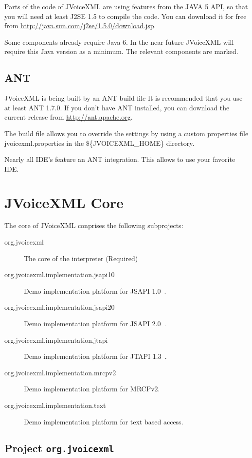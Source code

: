 \documentclass[11pt,a4paper]{article}
\begin{document}
Parts of the code of JVoiceXML are using features from the JAVA 5 API, so that
you will need at least J2SE 1.5 to compile the code. You can download it
for free from \url{http://java.sun.com/j2se/1.5.0/download.jsp}.

Some components already require Java 6. In the near future JVoiceXML will
require this Java version as a minimum. The relevant components are marked. 

\subsection{ANT}
\label{sec:ant}

JVoiceXML is being built by an ANT build file It is recommended that
you use at least ANT 1.7.0. 
If you don't have ANT installed, you can download the current release
from \url{http://ant.apache.org}.

The build file allows you to override the settings by using a custom 
properties file jvoicexml.properties in the \$\{JVOICEXML\_HOME\}
directory.

Nearly all IDE's feature an ANT integration. This allows to use
your favorite IDE.

\section{JVoiceXML Core}

The core of JVoiceXML conprises the following subprojects:

\begin{description}
\item[org.jvoicexml] The core of the interpreter (Required)
\item[org.jvoicexml.implementation.jsapi10] Demo implementation platform for
JSAPI 1.0~\cite{sun:jsapi}.
\item[org.jvoicexml.implementation.jsapi20] Demo implementation platform for
JSAPI 2.0~\cite{jcp:jsr113}.
\item[org.jvoicexml.implementation.jtapi] Demo implementation platform for
JTAPI 1.3~\cite{sun:jtapi}.
\item[org.jvoicexml.implementation.mrcpv2] Demo implementation platform for
MRCPv2.
\item[org.jvoicexml.implementation.text] Demo implementation platform for
text based access.
\end{description}

\subsection{Project \lstinline{org.jvoicexml}}
\end{document}
